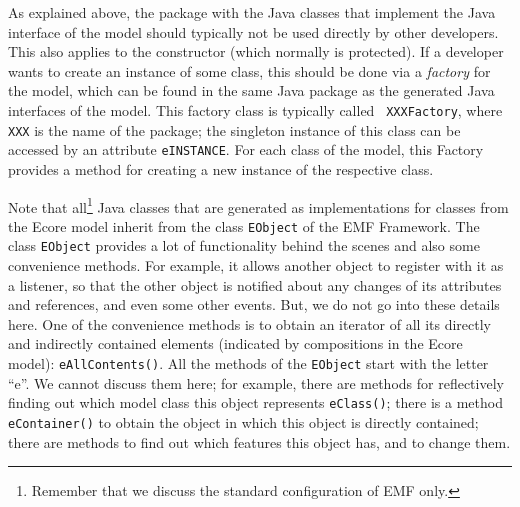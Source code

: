 As explained above, the package with the Java classes that implement the
Java interface of the model should typically not be used directly by other
developers. This also applies to the constructor (which normally is protected).
If a developer wants to create an instance of some class, this should be
done via a \emph{factory}%
for the model, which can be found in the same Java package as the generated Java
interfaces of the model. This factory class is typically called {\tt
XXXFactory}, where  {\tt XXX} is the name of the package; the singleton
instance of this class can be accessed by an attribute {\tt eINSTANCE}.
For each class of the model, this Factory provides a method for creating
a new instance of the respective class.%


Note that all\footnote
  {Remember that we discuss the standard configuration of EMF only.}
Java classes that are generated as implementations for classes from the Ecore
model inherit from the class {\tt EObject}%
of the EMF Framework. The class {\tt EObject} provides a lot of functionality
behind the scenes and also some convenience methods. For example, it allows another object
to register with it as a listener, so that the other object is notified
about any changes of its attributes and references, and even some other events.
But, we do not go into these details here. One of the convenience methods
is to obtain an iterator of all its directly and indirectly contained
elements (indicated by compositions in the Ecore model): {\tt eAllContents()}.%
All the methods of the {\tt EObject} start with the letter ``e''. We
cannot discuss them here; for example, there are methods for reflectively
finding out which model class this object represents {\tt eClass()};%
there is a method {\tt eContainer()}%
to obtain the object in which this object is directly contained; there are
methods to find out which features this object has, and to change them.

